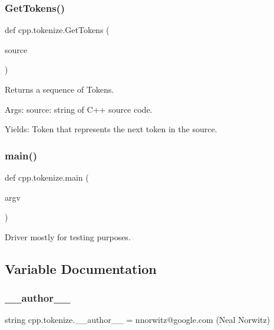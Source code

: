 \mbox{\label{namespacecpp_1_1tokenize_ab78959b4d0a9c3bade98904a23129afc}} 
\subsubsection{\texorpdfstring{GetTokens()}{GetTokens()}}
{\footnotesize\ttfamily def cpp.\+tokenize.\+Get\+Tokens (\begin{DoxyParamCaption}\item[{}]{source }\end{DoxyParamCaption})}

\begin{DoxyVerb}Returns a sequence of Tokens.

Args:
  source: string of C++ source code.

Yields:
  Token that represents the next token in the source.
\end{DoxyVerb}
 \mbox{\label{namespacecpp_1_1tokenize_ae666c331b4bd7d1f3e8956c78cc6f3a4}} 
\subsubsection{\texorpdfstring{main()}{main()}}
{\footnotesize\ttfamily def cpp.\+tokenize.\+main (\begin{DoxyParamCaption}\item[{}]{argv }\end{DoxyParamCaption})}

\begin{DoxyVerb}Driver mostly for testing purposes.\end{DoxyVerb}
 

\subsection{Variable Documentation}
\mbox{\label{namespacecpp_1_1tokenize_a13ec118ce7f7df6ecd18b3c74d37708a}} 
\subsubsection{\texorpdfstring{\_\_author\_\_}{\_\_author\_\_}}
{\footnotesize\ttfamily string cpp.\+tokenize.\+\_\+\+\_\+author\+\_\+\+\_\+ = \textquotesingle{}nnorwitz@google.\+com (Neal Norwitz)\textquotesingle{}\hspace{0.3cm}{\ttfamily [private]}}

